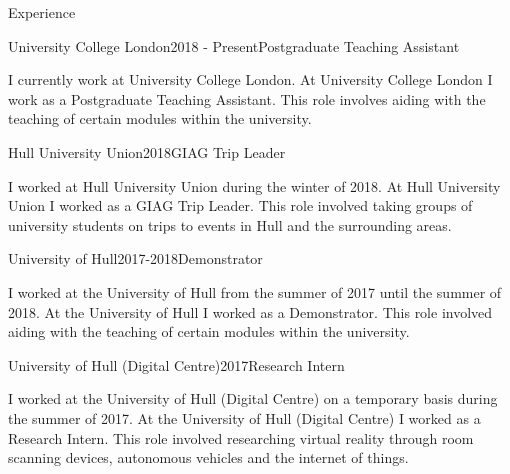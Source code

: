 \documentclass{cv} %
\begin{document}
\begin{rSection}{Experience}

\begin{rSubsection}{University College London}{2018 - Present}{Postgraduate Teaching Assistant}{}

\item I currently work at University College London. At University College London I work as a Postgraduate Teaching Assistant. This role involves aiding with the teaching of certain modules within the university.

\end{rSubsection}


\begin{rSubsection}{Hull University Union}{2018}{GIAG Trip Leader}{}

\item I worked at Hull University Union during the winter of 2018. At Hull University Union I worked as a GIAG Trip Leader. This role involved taking groups of university students on trips to events in Hull and the surrounding areas.

\end{rSubsection}


\begin{rSubsection}{University of Hull}{2017-2018}{Demonstrator}{}

\item I worked at the University of Hull from the summer of 2017 until the summer of 2018. At the University of Hull I worked as a Demonstrator. This role involved aiding with the teaching of certain modules within the university.

\end{rSubsection}


\begin{rSubsection}{University of Hull (Digital Centre)}{2017}{Research Intern}{}

\item I worked at the University of Hull (Digital Centre) on a temporary basis during the summer of 2017. At the University of Hull (Digital Centre) I worked as a Research Intern. This role involved researching virtual reality through room scanning devices, autonomous vehicles and the internet of things.


\end{rSubsection}
\end{rSection}
\end{document}
